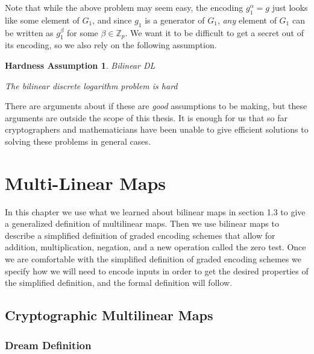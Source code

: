 \documentclass[12pt,twoside]{reedthesis}
\newtheorem{assumption}{Hardness Assumption}
\newcommand{\Z}[0]{\mathbb{Z}}
\begin{document}
    Note that while the above problem may seem easy, the encoding $g_1^\alpha = g $ just looks like some element of $G_1$, and since $g_1$ is a generator of $G_1$, \textit{any} element of $G_1$ can be written as $g_1^\beta$ for some $\beta \in \Z_p$. We want it to be difficult to get a secret out of its encoding, so we also rely on the following assumption.
    
    \begin{assumption}{Bilinear DL}
    \par The bilinear discrete logarithm problem is hard
    \end{assumption}
   
    
   \par There are arguments about if these are \textit{good} assumptions to be making, but these arguments are outside the scope of this thesis. It is enough for us that so far cryptographers and mathematicians have been unable to give efficient solutions to solving these problems in general cases.
    
    
    \chapter{Multi-Linear Maps}
    

    In this chapter we use what we learned about bilinear maps in section 1.3 to give a generalized definition of multilinear maps. Then we use bilinear maps to describe a simplified definition of graded encoding schemes that allow for addition, multiplication, negation, and a new operation called the zero test. Once we are comfortable with the simplified definition of graded encoding schemes we specify how we will need to encode inputs in order to get the desired properties of the simplified definition, and the formal definition will follow. 
    \section{Cryptographic Multilinear Maps}
    
    
    \subsection{Dream Definition}
    
\end{document}
